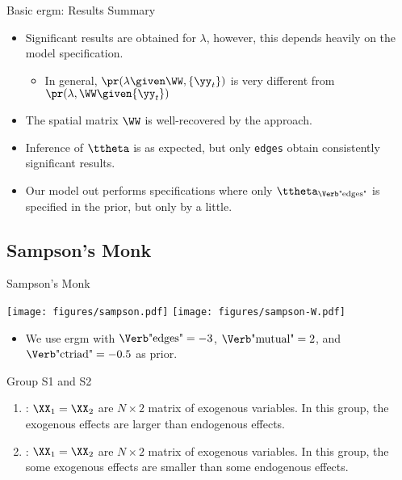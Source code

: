 \documentclass{beamer}
\begin{document}
\begin{frame}{Basic \acrshort{ergm}: Results Summary}
	\begin{itemize}
		\item
			Significant results are obtained for $\lambda$,
			however, this depends heavily on the model specification.
			\begin{itemize}
				\item In general, $\pr(\lambda\given\WW,\{\yy_{t}\})$ is very different from $\pr(\lambda,\WW\given\{\yy_{t}\})$
			\end{itemize}
		\item
			The spatial matrix $\WW$ is well-recovered by the approach.
		\item
			Inference of $\ttheta$ is as expected,
			but only \texttt{edges} obtain consistently significant results.
		\item
			Our model out performs specifications where only $\ttheta_{\text{\Verb"edges"}}$ is specified in the prior,
			but only by a little.
	\end{itemize}
\end{frame}

\subsection{Sampson's Monk}

\begin{frame}[fragile]{Sampson's Monk}
	\begin{center}
		\texttt{[image: figures/sampson.pdf]}
		\texttt{[image: figures/sampson-W.pdf]}
	\end{center}
	\begin{itemize}
		\item
			We use \acrshort{ergm} with
			$\text{\Verb"edges"}=-3$,
			$\text{\Verb"mutual"}=2$, and
			$\text{\Verb"ctriad"}=-0.5$ as prior.
	\end{itemize}
\end{frame}

\begin{frame}{Group S1 and S2}
	\begin{enumerate}
		\item{}:
			$\XX_1=\XX_2$ are $N\times 2$ matrix of exogenous variables.
			In this group, the exogenous effects are larger than endogenous effects.
		\item{}:
			$\XX_1=\XX_2$ are $N\times 2$ matrix of exogenous variables.
			In this group, the some exogenous effects are smaller than some endogenous effects.
	\end{enumerate}
\end{frame}
\end{document}
